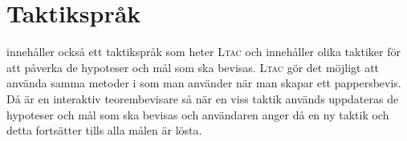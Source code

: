 \section{Taktikspråk}
\coq innehåller också ett taktikspråk som heter \textsc{Ltac} och innehåller
olika taktiker för att påverka de hypoteser och mål som ska bevisas.
\textsc{Ltac} gör det möjligt att använda samma metoder i \coq som man använder
när man skapar ett pappersbevis. Då \coq är en interaktiv teorembevisare så när
en viss taktik används uppdateras de hypoteser och mål som ska bevisas och
användaren anger då en ny taktik och detta fortsätter tills alla målen är
lösta.

